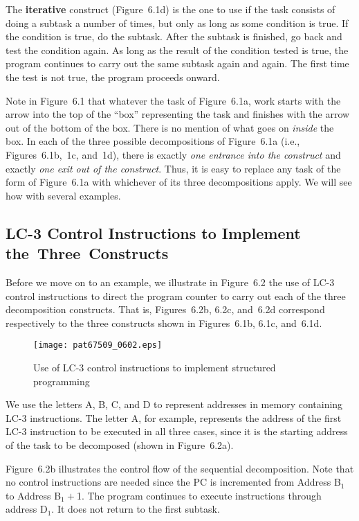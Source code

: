 \documentclass{patt}
\begin{document}
The {\bf iterative} construct (Figure~6.1d) is the one to use if
the task consists of
doing a subtask a number of times, but only as long as some condition
is true.  If the condition is true, do the subtask. After the subtask
is finished, go back and test the condition again. As long as the result
of the condition tested is true, the program continues to carry out the
same subtask again and again.  The first time the test is not true, 
the program proceeds onward.

Note in Figure~6.1 that whatever the task of Figure~6.1a, work
starts with the arrow into the top of the ``box'' representing
the task and finishes with the arrow out of the bottom of the
box. There is no mention of what goes on {\em inside} the box.
In each of the three possible decompositions of Figure~6.1a
(i.e., Figures~6.1b,~1c, and~1d), there is exactly {\em one entrance
into the construct} and exactly  {\em one exit out of the construct}.
Thus, it is easy to replace any task of the form of Figure~6.1a
with whichever of its three decompositions apply. We will see
how with several examples.

\subsection{LC-3 Control Instructions to Implement
  the~Three~Constructs}

Before we move on to an example, we illustrate in
Figure~6.2 the use of \hbox{LC-3} control instructions to direct the
program counter to carry out each of the three decomposition
constructs. That is, Figures~6.2b, 6.2c, and~6.2d correspond
respectively to the three constructs shown in Figures~6.1b,
6.1c, and~6.1d.

\begin{figure}
\centerline{\texttt{[image: pat67509\_0602.eps]}}
\caption{Use of LC-3 control instructions to
implement structured programming}
\label{fig:control}
\vspace{6pt}
\end{figure}

We use the letters A, B, C, and D to represent addresses in memory
containing LC-3 instructions. The letter A, for example, 
represents the address of the first LC-3 instruction to
be executed in all three cases, since it is the starting address of the
task to be decomposed (shown in Figure~6.2a).

Figure~6.2b illustrates the control flow of the sequential
decomposition.  Note that no control instructions are needed since
the PC is incremented from Address B$_1$ to Address B$_1+$1.  The
program continues to execute instructions through address D$_1$.
It does not return to the first subtask.
\end{document}
